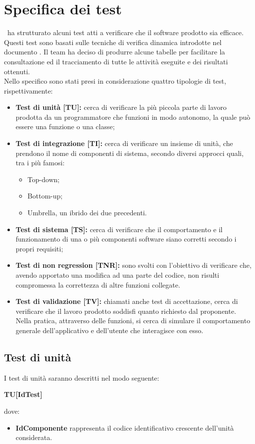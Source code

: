 \documentclass[../PianoDiQualifica_v4.0.0.tex]{subfiles}
\begin{document}
\section{Specifica dei test}
\kpanic\ ha strutturato alcuni test atti a verificare che il software prodotto sia efficace. Questi test sono basati sulle tecniche di verifica dinamica introdotte nel documento \normediprogettov. Il team ha deciso di produrre alcune tabelle per facilitare la consultazione ed il tracciamento di tutte le attività eseguite e dei risultati ottenuti.\\ Nello specifico sono stati presi in considerazione quattro tipologie di test, rispettivamente:
\begin{itemize}
	\item \textbf{Test di unità [TU]:} cerca di verificare la più piccola parte di lavoro prodotta da un programmatore che funzioni in modo autonomo, la quale può essere una funzione o una classe;
	\item \textbf{Test di integrazione [TI]:} cerca di verificare un insieme di unità, che prendono il nome di componenti di sistema, secondo diversi approcci quali, tra i più famosi:
	\begin{itemize}
		\item Top-down;
		\item Bottom-up;
		\item Umbrella, un ibrido dei due precedenti.
	\end{itemize}
	\item \textbf{Test di sistema [TS]:} cerca di verificare che il comportamento e il funzionamento di una o più componenti software siano corretti secondo i propri requisiti;

	\item \textbf{Test di non regression [TNR]:} sono svolti con l’obiettivo di verificare che, avendo apportato una modifica ad una parte del codice, non risulti compromessa la correttezza di altre funzioni collegate.

	\item \textbf{Test di validazione [TV]:} chiamati anche test di accettazione, cerca di verificare che il lavoro prodotto soddisfi quanto richiesto dal proponente. Nella pratica, attraverso delle funzioni, si cerca di simulare il comportamento generale dell'applicativo e dell'utente che interagisce con esso.
\end{itemize}

	\newpage
	\subsection{Test di unità}
	I test di unità saranno descritti nel modo seguente:
	\begin{center}
		\textbf{TU[IdTest]}
	\end{center}
	dove:
	\begin{itemize}
		\item \textbf{IdComponente} rappresenta il codice identificativo crescente dell'unità considerata.
	\end{itemize}
\end{document}
